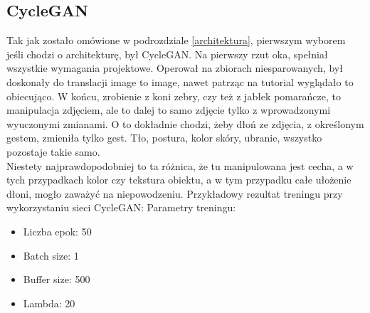 \documentclass[12pt]{article}
\begin{document}
\begin{sloppypar}
{  \subsection{CycleGAN}
  {
    Tak jak zostało omówione w podrozdziale \ref{architektura}, pierwszym wyborem jeśli chodzi o architekturę, był CycleGAN. 
    Na pierwszy rzut oka, spełniał wszystkie wymagania projektowe. 
    Operował na zbiorach niesparowanych, był doskonały do translacji image to image, nawet patrząc na tutorial \cite{cyclegan-tf} wyglądało to obiecująco. 
    W końcu, zrobienie z koni zebry, czy też z jabłek pomarańcze, to manipulacja zdjęciem, ale to dalej to samo zdjęcie tylko z wprowadzonymi wyuczonymi zmianami. 
    O to dokładnie chodzi, żeby dłoń ze zdjęcia, z określonym gestem, zmieniła tylko gest. Tło, postura, kolor skóry, ubranie, wszystko pozostaje takie samo. \\
    Niestety najprawdopodobniej to ta różnica, że tu manipulowana jest cecha, a w tych przypadkach kolor czy tekstura obiektu, a w tym przypadku całe ułożenie dłoni, mogło zaważyć na niepowodzeniu. 
    Przykładowy rezultat treningu przy wykorzystaniu sieci CycleGAN:
    Parametry treningu:
    \begin{itemize}
      \item Liczba epok: 50
      \item Batch size: 1
      \item Buffer size: 500
      \item Lambda: 20
    \end{itemize}

}}
\end{sloppypar}
\end{document}
